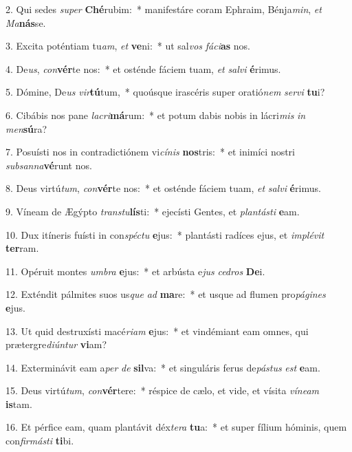 2. Qui sedes \textit{su}\textit{per} \textbf{Ché}rubim:~*  manifestáre coram Ephraim, Bénja\textit{min}, \textit{et} \textit{Ma}\textbf{nás}se.\

3. Excita poténtiam tu\textit{am}, \textit{et} \textbf{ve}ni:~*  ut sal\textit{vos} \textit{fá}\textit{ci}\textbf{as} nos.\

4. De\textit{us}, \textit{con}\textbf{vér}te nos:~*  et osténde fáciem tuam, \textit{et} \textit{sal}\textit{vi} \textbf{é}rimus.\

5. Dómine, De\textit{us} \textit{vir}\textbf{tú}tum,~*  quoúsque irascéris super oratió\textit{nem} \textit{ser}\textit{vi} \textbf{tu}i?\

6. Cibábis nos pane \textit{la}\textit{cri}\textbf{má}rum:~*  et potum dabis nobis in lácri\textit{mis} \textit{in} \textit{men}\textbf{sú}ra?\

7. Posuísti nos in contradictiónem vi\textit{cí}\textit{nis} \textbf{nos}tris:~*  et inimíci nostri \textit{sub}\textit{san}\textit{na}\textbf{vé}runt nos.\

8. Deus virtú\textit{tum}, \textit{con}\textbf{vér}te nos:~*  et osténde fáciem tuam, \textit{et} \textit{sal}\textit{vi} \textbf{é}rimus.\

9. Víneam de Ægýpto \textit{trans}\textit{tu}\textbf{lís}ti:~*  ejecísti Gentes, et \textit{plan}\textit{tás}\textit{ti} \textbf{e}am.\

10. Dux itíneris fuísti in con\textit{spéc}\textit{tu} \textbf{e}jus:~*  plantásti radíces ejus, et \textit{im}\textit{plé}\textit{vit} \textbf{ter}ram.\

11. Opéruit montes \textit{um}\textit{bra} \textbf{e}jus:~*  et arbústa e\textit{jus} \textit{ce}\textit{dros} \textbf{De}i.\

12. Exténdit pálmites suos us\textit{que} \textit{ad} \textbf{ma}re:~*  et usque ad flumen pro\textit{pá}\textit{gi}\textit{nes} \textbf{e}jus.\

13. Ut quid destruxísti macé\textit{ri}\textit{am} \textbf{e}jus:~*  et vindémiant eam omnes, qui prætergre\textit{di}\textit{ún}\textit{tur} \textbf{vi}am?\

14. Exterminávit eam a\textit{per} \textit{de} \textbf{sil}va:~*  et singuláris ferus de\textit{pás}\textit{tus} \textit{est} \textbf{e}am.\

15. Deus virtú\textit{tum}, \textit{con}\textbf{vér}tere:~*  réspice de cælo, et vide, et vísita \textit{ví}\textit{ne}\textit{am} \textbf{is}tam.\

16. Et pérfice eam, quam plantávit déx\textit{te}\textit{ra} \textbf{tu}a:~*  et super fílium hóminis, quem con\textit{fir}\textit{más}\textit{ti} \textbf{ti}bi.\

